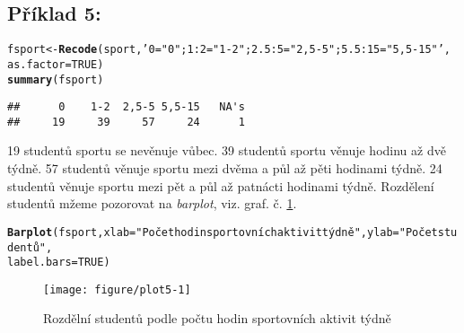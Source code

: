\documentclass[twoside]{article}\usepackage[]{graphicx}\usepackage[]{color}
\makeatletter
\def\maxwidth{ %
  \ifdim\Gin@nat@width>\linewidth
    \linewidth
  \else
    \Gin@nat@width
  \fi
}
\newcommand{\hlnum}[1]{\textcolor[rgb]{0.686,0.059,0.569}{#1}}%
\newcommand{\hlstr}[1]{\textcolor[rgb]{0.192,0.494,0.8}{#1}}%
\newcommand{\hlstd}[1]{\textcolor[rgb]{0.345,0.345,0.345}{#1}}%
\newcommand{\hlkwb}[1]{\textcolor[rgb]{0.69,0.353,0.396}{#1}}%
\newcommand{\hlkwc}[1]{\textcolor[rgb]{0.333,0.667,0.333}{#1}}%
\newcommand{\hlkwd}[1]{\textcolor[rgb]{0.737,0.353,0.396}{\textbf{#1}}}%
\newenvironment{kframe}{%
 \def\at@end@of@kframe{}%
 \ifinner\ifhmode%
  \def\at@end@of@kframe{\end{minipage}}%
  \begin{minipage}{\columnwidth}%
 \fi\fi%
 \def\FrameCommand##1{\hskip\@totalleftmargin \hskip-\fboxsep
 \colorbox{shadecolor}{##1}\hskip-\fboxsep
     \hskip-\linewidth \hskip-\@totalleftmargin \hskip\columnwidth}%
 \MakeFramed {\advance\hsize-\width
   \@totalleftmargin\z@ \linewidth\hsize
   \@setminipage}}%
 {\par\unskip\endMakeFramed%
 \at@end@of@kframe}
\newenvironment{knitrout}{}{} %
\makeatother
\begin{document}
\subsection*{Příklad 5:}
\begin{knitrout}
\color{fgcolor}\begin{kframe}
\begin{alltt}
\hlstd{fsport} \hlkwb{<-} \hlkwd{Recode}\hlstd{(sport,} \hlstr{'0="0"; 1:2="1-2"; 2.5:5="2,5-5"; 5.5:15="5,5-15"'}\hlstd{,}
    \hlkwc{as.factor}\hlstd{=}\hlnum{TRUE}\hlstd{)}
\hlkwd{summary}\hlstd{(fsport)}
\end{alltt}
\begin{verbatim}
##      0    1-2  2,5-5 5,5-15   NA's 
##     19     39     57     24      1
\end{verbatim}
\end{kframe}
\end{knitrout}

19 studentů sportu se nevěnuje vůbec. 39 studentů sportu věnuje hodinu až dvě týdně. 57 studentů věnuje sportu mezi dvěma a půl až pěti hodinami týdně. 24 studentů věnuje sportu mezi pět a půl až patnácti hodinami týdně. Rozdělení studentů mžeme pozorovat na \emph{barplot}, viz. graf. č. \ref{fig:plot5}.

\begin{knitrout}
\color{fgcolor}\begin{kframe}
\begin{alltt}
\hlkwd{Barplot}\hlstd{(fsport,} \hlkwc{xlab}\hlstd{=}\hlstr{"Počet hodin sportovních aktivit týdně"}\hlstd{,} \hlkwc{ylab}\hlstd{=}\hlstr{"Počet studentů"}\hlstd{,}
    \hlkwc{label.bars}\hlstd{=}\hlnum{TRUE}\hlstd{)}
\end{alltt}
\end{kframe}\begin{figure}[h]
\texttt{[image: figure/plot5-1]} \caption[Rozdělní studentů podle počtu hodin sportovních aktivit týdně]{Rozdělní studentů podle počtu hodin sportovních aktivit týdně}\label{fig:plot5}
\end{figure}


\end{knitrout}

\newpage
\end{document}
